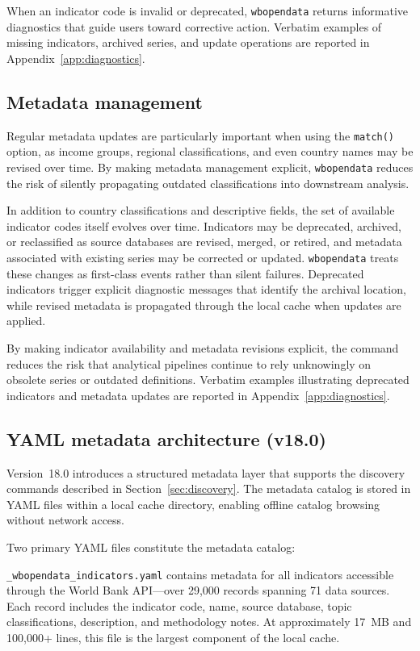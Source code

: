 \documentclass[bib]{statapress}
\begin{document}
When an indicator code is invalid or deprecated, \texttt{wbopendata} returns
informative diagnostics that guide users toward corrective action. Verbatim
examples of missing indicators, archived series, and update operations are
reported in Appendix~\ref{app:diagnostics}.

\subsection{Metadata management}\label{sec:metadata}

Regular metadata updates are particularly important when using the
\texttt{match()} option, as income groups, regional classifications, and even
country names may be revised over time. By making metadata management explicit,
\texttt{wbopendata} reduces the risk of silently propagating outdated
classifications into downstream analysis.

In addition to country classifications and descriptive fields, the set of
available indicator codes itself evolves over time. Indicators may be
deprecated, archived, or reclassified as source databases are revised, merged,
or retired, and metadata associated with existing series may be corrected or
updated. \texttt{wbopendata} treats these changes as first-class events rather
than silent failures. Deprecated indicators trigger explicit diagnostic
messages that identify the archival location, while revised metadata is
propagated through the local cache when updates are applied.

By making indicator availability and metadata revisions explicit, the command
reduces the risk that analytical pipelines continue to rely unknowingly on
obsolete series or outdated definitions. Verbatim examples illustrating
deprecated indicators and metadata updates are reported in Appendix~\ref{app:diagnostics}.

\subsection{YAML metadata architecture (v18.0)}\label{sec:yaml}

Version~18.0 introduces a structured metadata layer that supports the discovery
commands described in Section~\ref{sec:discovery}. The metadata catalog is stored
in YAML files within a local cache directory, enabling offline catalog browsing
without network access.

Two primary YAML files constitute the metadata catalog:

\hangpara
\texttt{\_wbopendata\_indicators.yaml} contains metadata for all indicators
accessible through the World Bank API---over 29{,}000 records spanning 71 data
sources. Each record includes the indicator code, name, source database,
topic classifications, description, and methodology notes. At approximately
17~MB and 100{,}000+ lines, this file is the largest component of the local
cache.
\end{document}
